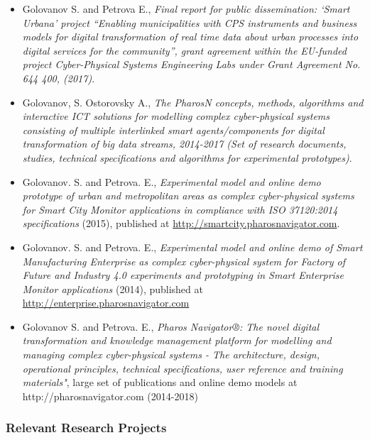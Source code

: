 \documentclass[a4paper,11pt]{article}
\begin{document}
\begin{itemize}
\item Golovanov S. and Petrova E., \emph{Final report for public dissemination: ‘Smart Urbana’ project “Enabling municipalities with CPS instruments and business models for digital transformation of real time data about urban processes into digital services for the community”, grant agreement within the EU-funded project Cyber-Physical Systems Engineering Labs under Grant Agreement No. 644 400, (2017)}.  
\item Golovanov, S. Ostorovsky A., \emph{The PharosN concepts, methods, algorithms and interactive ICT solutions for modelling complex cyber-physical systems consisting of multiple interlinked smart agents/components for digital transformation of big data streams, 2014-2017 (Set of research documents, studies, technical specifications and algorithms for experimental prototypes)}.
\item Golovanov. S. and Petrova. E., \emph{Experimental model and online demo prototype of urban and metropolitan areas as complex cyber-physical systems for Smart City Monitor applications in compliance with ISO 37120:2014 specifications} (2015), published at \url{http://smartcity.pharosnavigator.com}.
\item Golovanov. S. and Petrova. E., \emph{Experimental model and online demo of Smart Manufacturing Enterprise as complex cyber-physical system for Factory of Future and Industry 4.0 experiments and prototyping in Smart Enterprise Monitor applications} (2014), published at \url{http://enterprise.pharosnavigator.com}
\item Golovanov S. and Petrova. E., \emph{Pharos Navigator®: The novel digital transformation and knowledge management platform for modelling and managing complex cyber-physical systems - The architecture, design, operational principles, technical specifications, user reference and training materials"}, large set of publications and online demo models at http://pharosnavigator.com (2014-2018)   
\end{itemize}

\subsubsection*{Relevant Research Projects}
\end{document}
